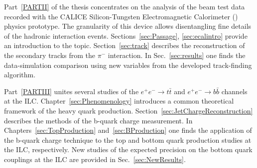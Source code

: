 Part~\ref{PARTII} of the thesis concentrates on the analysis of the beam test data recorded with the CALICE Silicon-Tungsten Electromagnetic Calorimeter (\ecal) physics prototype. The granularity of this device allows disentangling fine details of the hadronic interaction events. Sections~\ref{sec:Passage}, \ref{sec:ecalintro} provide an introduction to the topic. Section~\ref{sec:track} describes the reconstruction of the secondary tracks from the $\pi^-$ interaction. 
In Sec.~\ref{sec:results} one finds the data-simulation comparison using new variables from the developed track-finding algorithm.

Part~\ref{PARTIII} unites several studies  of the $e^+e^- \to t\bar{t}$ and $e^+e^- \to b\bar{b}$ channels at the ILC.
Chapter~\ref{sec:Phenomenology} introduces a common theoretical framework of the heavy quark production. Section~\ref{sec:JetChargeReconstruction} describes the methods of the b-quark charge measurement. In Chapters~\ref{sec:TopProduction} and~\ref{sec:BProduction} one finds the application of the b-quark charge technique to the top and bottom quark production studies at the ILC, respectively. New studies of the expected precision on the bottom quark couplings at the ILC are provided in Sec.~\ref{sec:NewResults}. 












